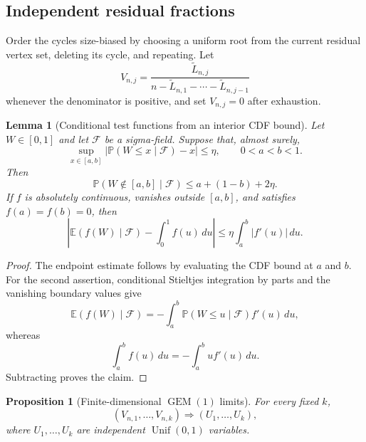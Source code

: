 \documentclass[11pt]{article}
\newtheorem{proposition}[theorem]{Proposition}
\newtheorem{lemma}[theorem]{Lemma}
\theoremstyle{remark}
\newcommand{\Pp}{\mathbb P}
\newcommand{\Ee}{\mathbb E}
\newcommand{\dd}{\,d}
\begin{document}
\subsection{Independent residual fractions}

Order the cycles size-biased by choosing a uniform root from the current
residual vertex set, deleting its cycle, and repeating.  Let
\[
 V_{n,j}=\frac{\widetilde L_{n,j}}
 {n-\widetilde L_{n,1}-\cdots-\widetilde L_{n,j-1}}
\]
whenever the denominator is positive, and set $V_{n,j}=0$ after exhaustion.

\begin{lemma}[Conditional test functions from an interior CDF bound]
\label{lem:pd-cdf-test}
Let $W\in[0,1]$ and let $\mathscr F$ be a sigma-field.  Suppose that, almost
surely,
\[
        \sup_{x\in[a,b]}
        |\Pp(W\le x\mid\mathscr F)-x|\le\eta,
        \qquad 0<a<b<1.
\]
Then
\[
        \Pp(W\notin[a,b]\mid\mathscr F)
        \le a+(1-b)+2\eta.
\]
If $f$ is absolutely continuous, vanishes outside $[a,b]$, and satisfies
$f(a)=f(b)=0$, then
\[
 \left|\Ee(f(W)\mid\mathscr F)-\int_0^1f(u)\dd u\right|
 \le\eta\int_a^b|f'(u)|\dd u.
\]
\end{lemma}

\begin{proof}
The endpoint estimate follows by evaluating the CDF bound at $a$ and $b$.
For the second assertion, conditional Stieltjes integration by parts and the
vanishing boundary values give
\[
        \Ee(f(W)\mid\mathscr F)
        =-\int_a^b\Pp(W\le u\mid\mathscr F)f'(u)\dd u,
\]
whereas
\[
        \int_a^bf(u)\dd u=-\int_a^bu f'(u)\dd u.
\]
Subtracting proves the claim.
\end{proof}

\begin{proposition}[Finite-dimensional $\operatorname{GEM}(1)$ limits]
\label{prop:pd-residual-uniforms}
For every fixed $k$,
\[
        (V_{n,1},\ldots,V_{n,k})
        \Rightarrow(U_1,\ldots,U_k),
\]
where $U_1,\ldots,U_k$ are independent $\operatorname{Unif}(0,1)$ variables.
\end{proposition}
\end{document}

